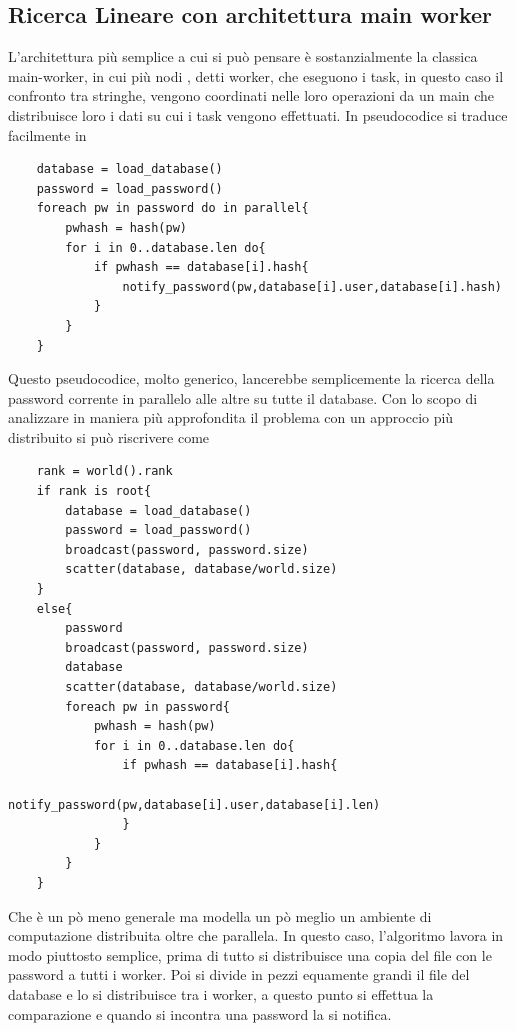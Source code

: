 

\subsection{Ricerca Lineare con architettura main worker}
L'architettura più semplice a cui si può pensare è sostanzialmente la classica main-worker, in cui più nodi , detti worker, che eseguono i task, in questo caso il confronto tra stringhe, vengono coordinati nelle loro operazioni da un main che distribuisce loro i dati su cui i task vengono effettuati. In pseudocodice si traduce facilmente in 

\begin{lstlisting}
    database = load_database()
    password = load_password()
    foreach pw in password do in parallel{
        pwhash = hash(pw)
        for i in 0..database.len do{
            if pwhash == database[i].hash{
                notify_password(pw,database[i].user,database[i].hash)
            }
        }
    }
\end{lstlisting}

Questo pseudocodice, molto generico, lancerebbe semplicemente la ricerca della password corrente in parallelo alle altre su tutte il database. Con lo scopo di analizzare in maniera più approfondita il problema con un approccio più distribuito si può riscrivere come\footnotemark[2]

\begin{lstlisting}
    rank = world().rank 
    if rank is root{
        database = load_database()
        password = load_password()
        broadcast(password, password.size)
        scatter(database, database/world.size)
    }
    else{
        password
        broadcast(password, password.size)
        database 
        scatter(database, database/world.size)
        foreach pw in password{
            pwhash = hash(pw)
            for i in 0..database.len do{
                if pwhash == database[i].hash{
                    notify_password(pw,database[i].user,database[i].len)
                }
            }
        }
    }
\end{lstlisting}

Che è un pò meno generale ma modella un pò meglio un ambiente di computazione distribuita oltre che parallela. In questo caso, l'algoritmo lavora in modo piuttosto semplice, prima di tutto si distribuisce una copia del file con le password a tutti i worker. Poi si divide in pezzi equamente grandi il file del database e lo si distribuisce tra i worker, a questo punto si effettua la comparazione e quando si incontra una password la si notifica. 


